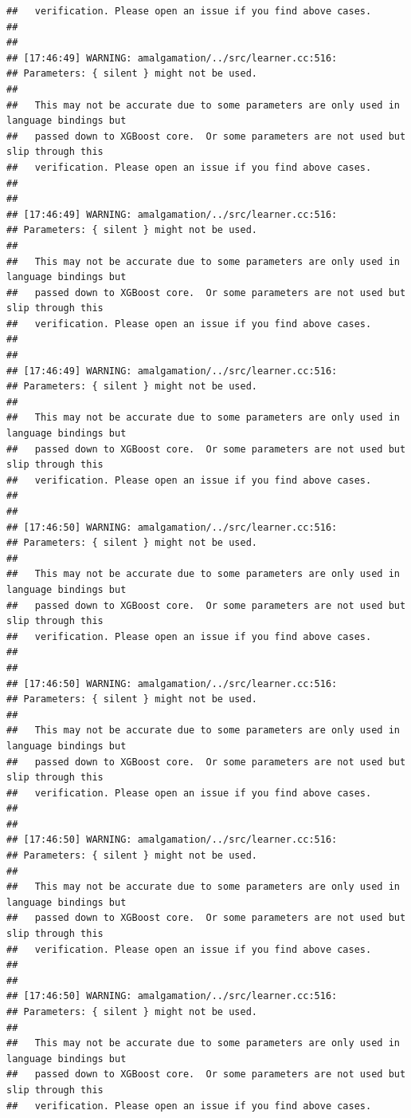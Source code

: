 \documentclass[AMS,STIX2COL]{WileyNJD-v2}\usepackage[]{graphicx}\usepackage[]{color}
\makeatletter
\newenvironment{kframe}{%
 \def\at@end@of@kframe{}%
 \ifinner\ifhmode%
  \def\at@end@of@kframe{\end{minipage}}%
  \begin{minipage}{\columnwidth}%
 \fi\fi%
 \def\FrameCommand##1{\hskip\@totalleftmargin \hskip-\fboxsep
 \colorbox{shadecolor}{##1}\hskip-\fboxsep
     \hskip-\linewidth \hskip-\@totalleftmargin \hskip\columnwidth}%
 \MakeFramed {\advance\hsize-\width
   \@totalleftmargin\z@ \linewidth\hsize
   \@setminipage}}%
 {\par\unskip\endMakeFramed%
 \at@end@of@kframe}
\newenvironment{knitrout}{}{} %
\makeatother
\begin{document}
\begin{knitrout}
\begin{kframe}
\begin{verbatim}
##   verification. Please open an issue if you find above cases.
## 
## 
## [17:46:49] WARNING: amalgamation/../src/learner.cc:516: 
## Parameters: { silent } might not be used.
## 
##   This may not be accurate due to some parameters are only used in language bindings but
##   passed down to XGBoost core.  Or some parameters are not used but slip through this
##   verification. Please open an issue if you find above cases.
## 
## 
## [17:46:49] WARNING: amalgamation/../src/learner.cc:516: 
## Parameters: { silent } might not be used.
## 
##   This may not be accurate due to some parameters are only used in language bindings but
##   passed down to XGBoost core.  Or some parameters are not used but slip through this
##   verification. Please open an issue if you find above cases.
## 
## 
## [17:46:49] WARNING: amalgamation/../src/learner.cc:516: 
## Parameters: { silent } might not be used.
## 
##   This may not be accurate due to some parameters are only used in language bindings but
##   passed down to XGBoost core.  Or some parameters are not used but slip through this
##   verification. Please open an issue if you find above cases.
## 
## 
## [17:46:50] WARNING: amalgamation/../src/learner.cc:516: 
## Parameters: { silent } might not be used.
## 
##   This may not be accurate due to some parameters are only used in language bindings but
##   passed down to XGBoost core.  Or some parameters are not used but slip through this
##   verification. Please open an issue if you find above cases.
## 
## 
## [17:46:50] WARNING: amalgamation/../src/learner.cc:516: 
## Parameters: { silent } might not be used.
## 
##   This may not be accurate due to some parameters are only used in language bindings but
##   passed down to XGBoost core.  Or some parameters are not used but slip through this
##   verification. Please open an issue if you find above cases.
## 
## 
## [17:46:50] WARNING: amalgamation/../src/learner.cc:516: 
## Parameters: { silent } might not be used.
## 
##   This may not be accurate due to some parameters are only used in language bindings but
##   passed down to XGBoost core.  Or some parameters are not used but slip through this
##   verification. Please open an issue if you find above cases.
## 
## 
## [17:46:50] WARNING: amalgamation/../src/learner.cc:516: 
## Parameters: { silent } might not be used.
## 
##   This may not be accurate due to some parameters are only used in language bindings but
##   passed down to XGBoost core.  Or some parameters are not used but slip through this
##   verification. Please open an issue if you find above cases.

\end{verbatim}
\end{kframe}
\end{knitrout}
\end{document}
